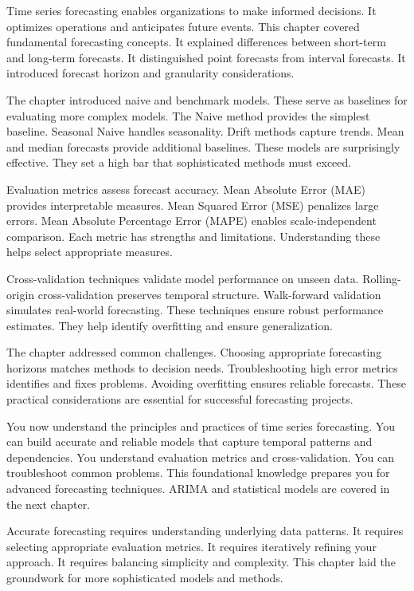 Time series forecasting enables organizations to make informed decisions. It optimizes operations and anticipates future events. This chapter covered fundamental forecasting concepts. It explained differences between short-term and long-term forecasts. It distinguished point forecasts from interval forecasts. It introduced forecast horizon and granularity considerations.

The chapter introduced naive and benchmark models. These serve as baselines for evaluating more complex models. The Naive method provides the simplest baseline. Seasonal Naive handles seasonality. Drift methods capture trends. Mean and median forecasts provide additional baselines. These models are surprisingly effective. They set a high bar that sophisticated methods must exceed.

Evaluation metrics assess forecast accuracy. Mean Absolute Error (MAE) provides interpretable measures. Mean Squared Error (MSE) penalizes large errors. Mean Absolute Percentage Error (MAPE) enables scale-independent comparison. Each metric has strengths and limitations. Understanding these helps select appropriate measures.

Cross-validation techniques validate model performance on unseen data. Rolling-origin cross-validation preserves temporal structure. Walk-forward validation simulates real-world forecasting. These techniques ensure robust performance estimates. They help identify overfitting and ensure generalization.

The chapter addressed common challenges. Choosing appropriate forecasting horizons matches methods to decision needs. Troubleshooting high error metrics identifies and fixes problems. Avoiding overfitting ensures reliable forecasts. These practical considerations are essential for successful forecasting projects.

You now understand the principles and practices of time series forecasting. You can build accurate and reliable models that capture temporal patterns and dependencies. You understand evaluation metrics and cross-validation. You can troubleshoot common problems. This foundational knowledge prepares you for advanced forecasting techniques. ARIMA and statistical models are covered in the next chapter.

Accurate forecasting requires understanding underlying data patterns. It requires selecting appropriate evaluation metrics. It requires iteratively refining your approach. It requires balancing simplicity and complexity. This chapter laid the groundwork for more sophisticated models and methods.

